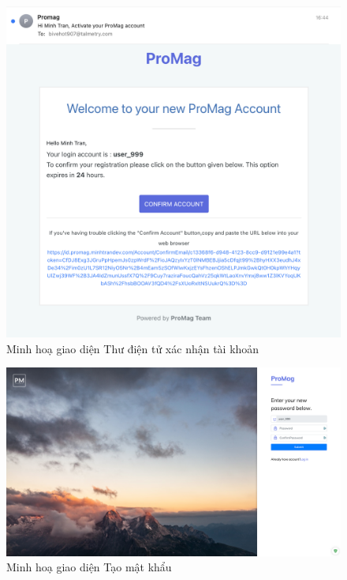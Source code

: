 \documentclass[../DoAn.tex]{subfiles}
\begin{document}
\newpage

\begin{figure}[H]
    \centering
    \includegraphics[width=1.0\linewidth]{Hinhve/Screenshot_CreateAccountEmail.png}
    \caption{Minh hoạ giao diện Thư điện tử xác nhận tài khoản}
    \label{fig:Screenshot_CreateAccountEmail}
\end{figure}

\newpage

\begin{figure}[H]
    \centering
    \includegraphics[width=1.0\linewidth]{Hinhve/Screenshot_CreatePassword.png}
    \caption{Minh hoạ giao diện Tạo mật khẩu}
    \label{fig:Screenshot_CreatePassword}
\end{figure}
\end{document}
